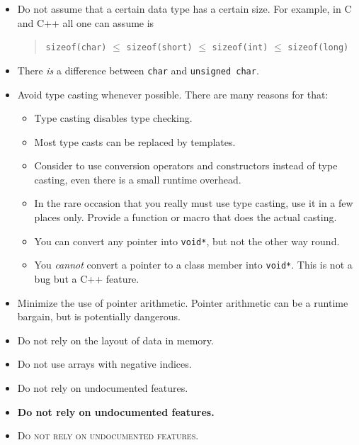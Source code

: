 \begin{itemize}
  
  \item Do not assume that a certain data type has a certain
  size. For example, in C and C++ all one can assume is

\begin{quote}
\texttt{sizeof(char)} $\leq$
\texttt{sizeof(short)} $\leq$
\texttt{sizeof(int)} $\leq$
\texttt{sizeof(long)}
\end{quote}
  
  \item There \emph{is} a difference between \texttt{char} and
  \texttt{unsigned char}.
  
  \item Avoid type casting whenever possible. There are many
  reasons for that:

  \begin{itemize}
    
    \item Type casting disables type checking.    
    
    \item Most type casts can be replaced by templates.
        
    \item Consider to use conversion operators and
    constructors instead of type casting, even there is a small 
    runtime overhead.
    
        \item In the rare occasion that you really must use type casting, 
        use it in a few places only.  Provide a function or macro that 
        does the actual casting.
    
    \item You can convert any pointer into \texttt{void*}, but
    not the other way round.
    
    \item You \emph{cannot} convert a pointer to a class member into
    \texttt{void*}. This is not a bug but a C++ feature.

  \end{itemize}
  
  \item Minimize the use of pointer arithmetic. Pointer
  arithmetic can be a runtime bargain, but is potentially
  dangerous.
  
  \item Do not rely on the layout of data in memory.
  
  \item Do not use arrays with negative indices.

  \item Do not rely on undocumented features.
  
  \item \textbf{Do not rely on undocumented features.}

  \item \textsc{Do not rely on undocumented features.}

\end{itemize}



